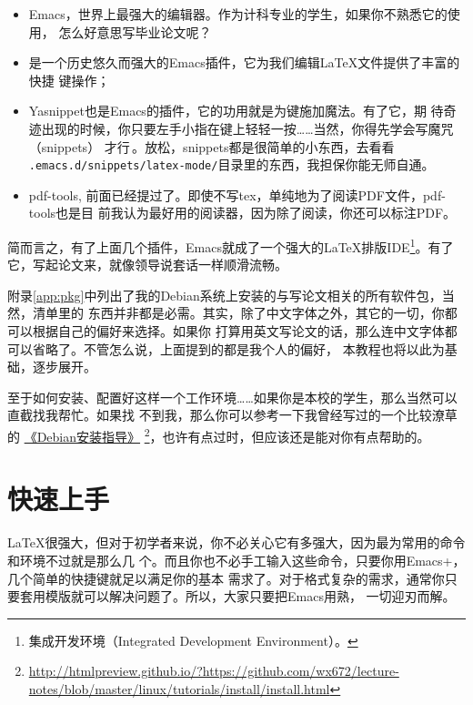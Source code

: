 \documentclass{swfcthesis}
\begin{document}
\begin{description}
  \begin{itemize}
  \item Emacs，世界上最强大的编辑器。\cite{emacs}作为计科专业的学生，如果你不熟悉它的使用，
    怎么好意思写毕业论文呢？
  \item \auctex{}是一个历史悠久而强大的Emacs插件，它为我们编辑\LaTeX{}文件提供了丰富的快捷
    键操作；\cite{auctex}
  \item Yasnippet也是Emacs的插件，它的功用就是为{\Tab}键施加魔法。\cite{yasnippet}有了它，期
    待奇迹出现的时候，你只要左手小指在{\Tab}键上轻轻一按……当然，你得先学会写魔咒（snippets）
    才行\,\Frowny{}。\label{p:yasnippet}放松，snippets都是很简单的小东西，去看看
    \texttt{.emacs.d/snippets/latex-mode/}目录里的东西，我担保你能无师自通。
  \item pdf-tools, 前面已经提过了。即使不写tex，单纯地为了阅读PDF文件，pdf-tools也是目
    前我认为最好用的阅读器，因为除了阅读，你还可以标注PDF。    
  \end{itemize}

  简而言之，有了上面几个插件，Emacs就成了一个强大的\LaTeX{}排版IDE\footnote{集成开发环境（Integrated
    Development Environment）。}。有了它，写起论文来，就像领导说套话一样顺滑流畅。
\end{description}

附录\ref{app:pkg}中列出了我的Debian系统上安装的与写论文相关的所有软件包，当然，清单里的
东西并非都是必需。其实，除了中文字体之外，其它的一切，你都可以根据自己的偏好来选择。如果你
打算用英文写论文的话，那么连中文字体都可以省略了。不管怎么说，上面提到的都是我个人的偏好，
本教程也将以此为基础，逐步展开。

至于如何安装、配置好这样一个工作环境……如果你是本校的学生，那么当然可以直截找我帮忙。如果找
不到我，那么你可以参考一下我曾经写过的一个比较潦草的%
\href{http://htmlpreview.github.io/?https://github.com/wx672/lecture-notes/blob/master/linux/tutorials/install/install.html}{《Debian安装指导》}%
\footnote{\url{http://htmlpreview.github.io/?https://github.com/wx672/lecture-notes/blob/master/linux/tutorials/install/install.html}}，也许有点过时，但应该还是能对你有点帮助的。

\chapter{快速上手}

\LaTeX{}很强大，但对于初学者来说，你不必关心它有多强大，因为最为常用的命令和环境不过就是那么几
个。而且你也不必手工输入这些命令，只要你用Emacs+\auctex{}，几个简单的快捷键就足以满足你的基本
需求了。对于格式复杂的需求，通常你只要套用模版就可以解决问题了。所以，大家只要把Emacs用熟，
一切迎刃而解。
\end{document}
